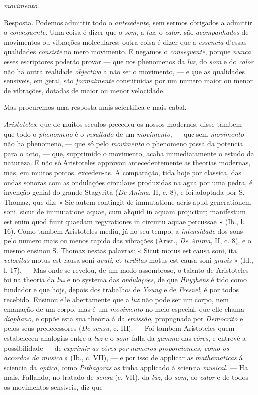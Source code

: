 \emph{movimento}.\par Resposta. Podemos admittir todo o \emph{antecedente}, sem sermos obrigados a admittir o \emph{consequente}. Uma coisa é dizer que o \emph{som}, a \emph{luz}, o \emph{calor}, são \emph{acompanhados} de movimentos ou vibrações moleculares; outra coisa é dizer que a \emph{essencia} d'essas qualidades \emph{consiste} no mero movimento. E negamos o \emph{consequente}, porque \emph{nunca} esses escriptores poderão provar --- que nos phenomenos da \emph{luz}, do \emph{som} e do \emph{calor} não ha outra realidade \emph{objectiva} a não ser o movimento, --- e que as qualidades sensiveis, em geral, são \emph{formalmente} constituidas por um numero maior ou menor de vibrações, dotadas de maior ou menor velocidade.\par Mas procuremos uma resposta mais scientifica e mais cabal.\par \emph{Aristoteles}, que de muitos seculos precedeu os nossos modernos, disse tambem --- que todo o \emph{phenomeno} é o \emph{resultado} de um \emph{movimento}, --- que sem \emph{movimento} não ha phenomeno, --- que só pelo \emph{movimento} o phenomeno passa da potencia para o acto, --- que, supprimido o movimento, acaba immediatamente o estudo da natureza. E não só Aristoteles approvou antecedentemente as theorias modernas, mas, em muitos pontos, excedeu-as. A comparação, tida hoje por classica, das ondas sonoras com as ondulações circulares produzidas na agua por uma pedra, é invenção genial do grande Stagyrita (\emph{De Anima}, II, c. 8), e foi adoptada por S. Thomaz, que diz: « Sic autem contingit de immutatione aeris apud generationem soni, sicut de immutatione aquae, cum aliquid in aquam projicitur; manifestum est enim quod fiunt quaedam regyrationes in circuitu aquae percussae » (Ib., l. 16). Como tambem Aristoteles mediu, já no seu tempo, a \emph{intensidade} dos sons pelo numero mais ou menos rapido das vibrações (Arist., \emph{De Anima}, II, c. 8), e o mesmo ensinou S. Thomaz nestas palavras: « Sicut motus est causa soni, ita \emph{velocitas} motus est causa soni \emph{acuti}, et \emph{tarditas} motus est causa soni \emph{gravis} » (Id., l. 17). --- Mas onde se revelou, de um modo assombroso, o talento de Aristoteles foi na theoria da \emph{luz} e no systema das \emph{ondulações}, de que \emph{Huyghens} é tido como fundador e que hoje, depois dos trabalhos de \emph{Young} e de \emph{Fresnel}, é por todos recebido. Ensinou elle abertamente que a \emph{luz} não pode ser um corpo, nem emanação de um corpo, mas é um \emph{movimento} no meio especial, que elle chama \emph{diaphano}, e oppõe esta sua theoria á da \emph{emissão}, propugnada por \emph{Democrito} e pelos seus predecessores (\emph{De sensu}, c. III). --- Foi tambem Aristoteles quem estabeleceu analogias entre a \emph{luz} e o \emph{som}; falla da \emph{gamma} das \emph{córes}, e entrevê a possibilidade --- de \emph{exprimir as córes por numeros proporcionaes, como os accordos da musica} » (Ib., c. VII), --- e por isso de applicar as \emph{mathematicas} á sciencia da \emph{optica}, como \emph{Pithagoras} as tinha applicado á sciencia \emph{musical}. --- Ha mais. Fallando, no tratado de \emph{sensu} (c. VII), da \emph{luz}, do \emph{som}, do \emph{calor} e de todos os movimentos sensiveis, diz que 